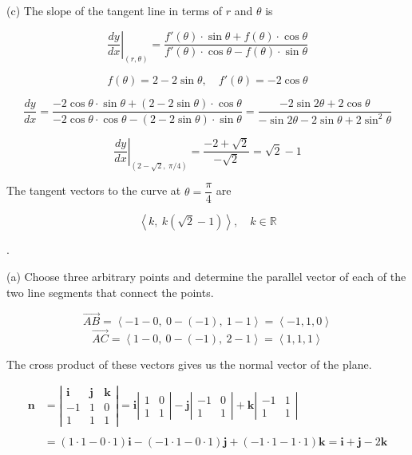 \documentclass{article}
\begin{document}
\hfill

\noindent (c) The slope of the tangent line in terms of $r$ and $\theta$ is

\[\left.\frac{dy}{dx}\right|_{(r,\theta)}=\frac{f'(\theta)\cdot\sin\theta+f(\theta)\cdot\cos\theta}{f'(\theta)\cdot\cos\theta-f(\theta)\cdot\sin\theta}\]

\[f(\theta)=2-2\sin\theta, \quad f'(\theta)=-2\cos\theta\]

\[\frac{dy}{dx}=\frac{-2\cos\theta\cdot\sin\theta+(2-2\sin\theta)\cdot\cos\theta}{-2\cos\theta\cdot\cos\theta-(2-2\sin\theta)\cdot\sin\theta}=\frac{-2\sin2\theta+2\cos\theta}{-\sin2\theta-2\sin\theta+2\sin^2\theta}\]

\[\left.\frac{dy}{dx}\right|_{\left(2-\sqrt2,\:\pi/4\right)}=\frac{-2+\sqrt2}{-\sqrt2}=\sqrt2-1\]

\hfill

\noindent The tangent vectors to the curve at $\theta=\dfrac\pi4$ are

\[\boxed{\left\langle k,\:k\left(\sqrt2-1\right)\right\rangle,\quad k\in\mathbb{R}}\]

\hfill

. 

\hfill

\noindent (a) Choose three arbitrary points and determine the parallel vector of each of the two line segments that connect the points.

\[\overrightarrow{AB}=\left\langle-1-0,\:0-(-1),\:1-1\right\rangle=\left\langle-1,1,0\right\rangle\]
\[\overrightarrow{AC}=\left\langle1-0,\:0-(-1),\:2-1\right\rangle=\left\langle1,1,1\right\rangle\]

\hfill

\noindent The cross product of these vectors gives us the normal vector of the plane.

\begin{align*}\mathbf{n}&=\left|\begin{array}{ccc}
\mathbf{i}&\mathbf{j}&\mathbf{k}\\
-1&1&0\\
1&1&1
\end{array}\right|=\mathbf{i}\left|\begin{array}{cc}
1&0\\1&1
\end{array}\right|-\mathbf{j}\left|\begin{array}{cc}
-1&0\\1&1
\end{array}\right|+\mathbf{k}\left|\begin{array}{cc}
-1&1\\1&1
\end{array}\right|\\\\&=(1\cdot1-0\cdot1)\mathbf{i}-(-1\cdot1-0\cdot1)\mathbf{j}+(-1\cdot1-1\cdot1)\mathbf{k}=\mathbf i+\mathbf j-2\mathbf k\end{align*}
\end{document}
